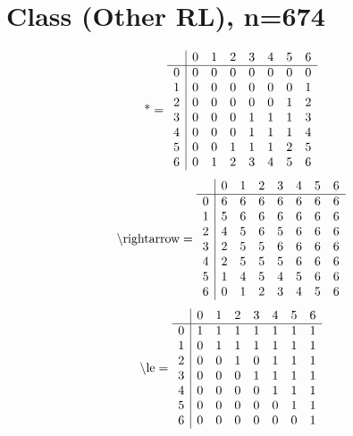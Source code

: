 \documentclass[11pt]{article}
\begin{document}
\section{Class (Other RL), n=674}
\[\text{*} = 
\begin{array}{r | r r r r r r r}
 & 0 & 1 & 2 & 3 & 4 & 5 & 6 \\ \hline
0 & 0 & 0 & 0 & 0 & 0 & 0 & 0 \\
1 & 0 & 0 & 0 & 0 & 0 & 0 & 1 \\
2 & 0 & 0 & 0 & 0 & 0 & 1 & 2 \\
3 & 0 & 0 & 0 & 1 & 1 & 1 & 3 \\
4 & 0 & 0 & 0 & 1 & 1 & 1 & 4 \\
5 & 0 & 0 & 1 & 1 & 1 & 2 & 5 \\
6 & 0 & 1 & 2 & 3 & 4 & 5 & 6 \\
\end{array}
\]
\[\text{\textbackslash rightarrow} = 
\begin{array}{r | r r r r r r r}
 & 0 & 1 & 2 & 3 & 4 & 5 & 6 \\ \hline
0 & 6 & 6 & 6 & 6 & 6 & 6 & 6 \\
1 & 5 & 6 & 6 & 6 & 6 & 6 & 6 \\
2 & 4 & 5 & 6 & 5 & 6 & 6 & 6 \\
3 & 2 & 5 & 5 & 6 & 6 & 6 & 6 \\
4 & 2 & 5 & 5 & 5 & 6 & 6 & 6 \\
5 & 1 & 4 & 5 & 4 & 5 & 6 & 6 \\
6 & 0 & 1 & 2 & 3 & 4 & 5 & 6 \\
\end{array}
\]
\[\text{\textbackslash le} = 
\begin{array}{r | r r r r r r r}
 & 0 & 1 & 2 & 3 & 4 & 5 & 6 \\ \hline
0 & 1 & 1 & 1 & 1 & 1 & 1 & 1 \\
1 & 0 & 1 & 1 & 1 & 1 & 1 & 1 \\
2 & 0 & 0 & 1 & 0 & 1 & 1 & 1 \\
3 & 0 & 0 & 0 & 1 & 1 & 1 & 1 \\
4 & 0 & 0 & 0 & 0 & 1 & 1 & 1 \\
5 & 0 & 0 & 0 & 0 & 0 & 1 & 1 \\
6 & 0 & 0 & 0 & 0 & 0 & 0 & 1 \\
\end{array}
\]
\end{document}
